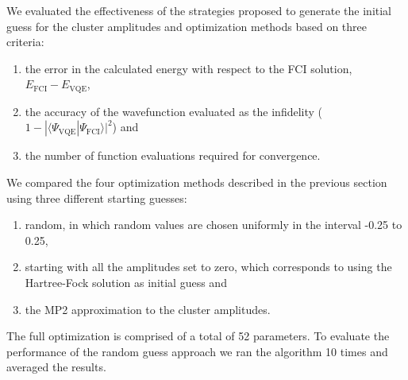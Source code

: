 \documentclass[superscriptaddress,aps,pra,twocolumn,nofootinbib,babel]{revtex4-1}
\begin{document}
We evaluated the effectiveness of the strategies proposed to generate the initial guess for the cluster amplitudes and optimization methods based on three criteria: \begin{enumerate} 
\item the error in the calculated energy with respect to the FCI solution, \mbox{$E_{\mathrm{FCI}}-E_{\mathrm{VQE}}$}, 
\item the accuracy of the wavefunction evaluated as the infidelity ($1-|\langle \Psi_{\mathrm{VQE}} | \Psi_{\mathrm{FCI}}\rangle|^2$) and 
\item the number of function evaluations required for convergence. \end{enumerate} 
We compared the four optimization methods described in the previous section using three different starting guesses: \begin{enumerate} 
\item random, in which random values are chosen uniformly in the interval -0.25 to 0.25, 
\item starting with all the amplitudes set to zero, which corresponds to using the Hartree-Fock solution as initial guess and
\item the MP2 approximation to the cluster amplitudes. \end{enumerate} 
The full optimization is comprised of a total of 52 parameters. To evaluate the performance of the random guess approach we ran the algorithm 10 times and averaged the results.
\end{document}
